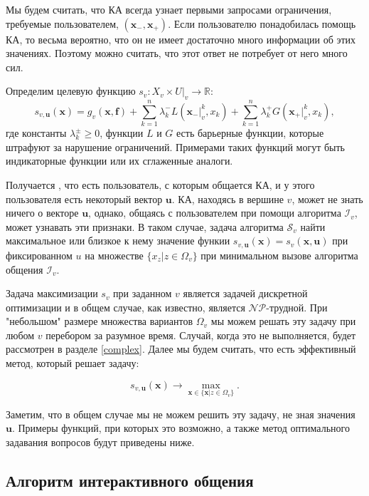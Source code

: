 \documentclass[12pt]{article}
\begin{document}
Мы будем считать, что КА всегда узнает первыми запросами ограничения, требуемые пользователем, $(\textbf{x}_-, \textbf{x}_+)$. Если пользователю понадобилась помощь КА, то весьма вероятно, что он не имеет достаточно много информации об этих значениях. Поэтому можно считать, что этот ответ не потребует от него много сил.

Определим целевую функцию $s_v:X_v \times U|_v\rightarrow \mathbb{R}$:
\begin{equation}
\label{s_v}
s_{v,\textbf{u}}(\textbf{x}) = g_v(\textbf{x}, \textbf{f}) + \sum\limits_{k=1}^n\lambda_k^- L(\textbf{x}_-|_v^k, x_k) + \sum\limits_{k=1}^n\lambda_k^+ G(\textbf{x}_+|_v^k, x_k),
\end{equation}
где константы $\lambda_k^\pm \geq 0$, функции $L$ и $G$ есть барьерные функции, которые штрафуют за нарушение ограничений. Примерами таких функций могут быть индикаторные функции или их сглаженные аналоги.

Получается , что есть пользователь, с которым общается КА, и у этого пользователя есть некоторый вектор $\textbf{u}$. КА, находясь в вершине $v$, может не знать ничего о векторе $\textbf{u}$, однако, общаясь с пользователем при помощи алгоритма $\mathcal{I}_v$, может узнавать эти признаки. В таком случае, задача алгоритма $\mathcal{S}_v$ найти максимальное или близкое к нему значение функии $s_{v,\textbf{u}}(\textbf{x}) = s_v(\textbf{x}, \textbf{u})$ при фиксированном $u$ на множестве $\{x_z|z \in \Omega_v\}$ при минимальном вызове алгоритма общения $\mathcal{I}_v$.

Задача максимизации $s_v$ при заданном $v$ является задачей дискретной оптимизации и в общем случае, как известно, является $\mathcal{NP}$-трудной. При "небольшом" размере множества вариантов $\Omega_v$ мы можем решать эту задачу при любом $v$ перебором за разумное время. Случай, когда это не выполняется, будет рассмотрен в разделе \ref{complex}. Далее мы будем считать, что есть эффективный метод, который решает задачу:

\begin{equation}
s_{v,\textbf{u}}(\textbf{x})\rightarrow \max\limits_{\textbf{x}\in \{\textbf{x}|z\in \Omega_v\}}.
\end{equation}

Заметим, что в общем случае мы не можем решить эту задачу, не зная значения $\textbf{u}$. Примеры функций, при которых это возможно, а также метод оптимального задавания вопросов будут приведены ниже.

\subsection{Алгоритм интерактивного общения}
\end{document}
